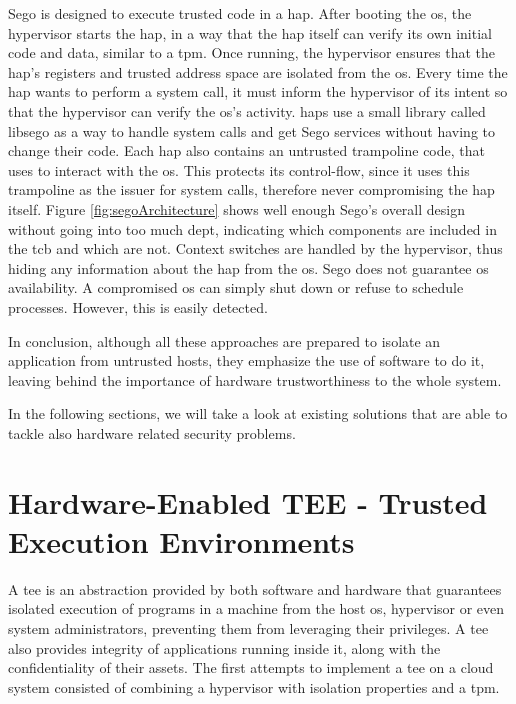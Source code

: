 Sego is designed to execute trusted code in a \gls{hap}.
After booting the \gls{os}, the hypervisor starts the \gls{hap}, in a way that the \gls{hap} itself can verify its own initial code and data, similar to a \gls{tpm}.
Once running, the hypervisor ensures that the \gls{hap}’s registers and trusted address space are isolated from the \gls{os}. Every time the \gls{hap} wants to perform a system call, it must inform
the hypervisor of its intent so that the hypervisor can verify the \gls{os}'s activity. \gls{hap}s use a
small library called libsego as a way to handle system calls and get Sego services without having to change their code. Each \gls{hap} also contains an untrusted trampoline code, that
uses to interact with the \gls{os}. This protects its control-flow, since it uses this trampoline as the issuer for system calls, therefore never compromising the \gls{hap} itself. Figure \ref{fig:segoArchitecture} shows well enough Sego’s overall design without going into too much dept, indicating which components are included in the \gls{tcb} and which are not.
Context switches are handled by the hypervisor, thus hiding any information about the \gls{hap} from the \gls{os}.
Sego does not guarantee \gls{os} availability. A compromised \gls{os} can simply shut down or refuse to schedule processes. However, this is easily detected.

In conclusion, although all these approaches are prepared to isolate an application from untrusted hosts, they emphasize the use of software to do it, leaving behind the importance of hardware trustworthiness to the whole system.

In the following sections, we will take a look at existing solutions that are able to tackle also hardware related security problems.

\section{Hardware-Enabled TEE - Trusted Execution Environments}
\label{sec:tpm_hsm_tees}

A \gls{tee} is an abstraction provided by both software and hardware that guarantees isolated execution of programs in a machine from the host \gls{os}, hypervisor or even system administrators, preventing them from leveraging their privileges. A \gls{tee} also provides integrity of applications running inside it, along with the confidentiality of their assets.
The first attempts to implement a \gls{tee} on a cloud system consisted of combining a hypervisor with isolation properties and a \gls{tpm}. 

